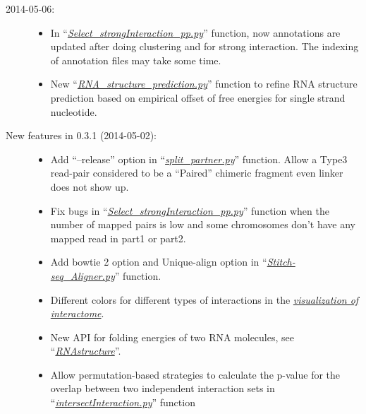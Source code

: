 \documentclass[letterpaper,10pt,english]{sphinxmanual}
\begin{document}
\begin{description}
\begin{itemize}
\end{itemize}

\item[{2014-05-06:}] \leavevmode\begin{itemize}
\item {} 
In ``{\hyperref[Analysis_pipeline:step6]{\emph{Select\_strongInteraction\_pp.py}}}'' function, now annotations are updated after doing clustering and for strong interaction. The indexing of annotation files may take some time.

\item {} 
New ``{\hyperref[Analysis_pipeline:structure]{\emph{RNA\_structure\_prediction.py}}}'' function to refine RNA structure prediction based on empirical offset of free energies for single strand nucleotide.

\end{itemize}

\item[{New features in 0.3.1 (2014-05-02):}] \leavevmode\begin{itemize}
\item {} 
Add ``--release'' option in ``{\hyperref[Analysis_pipeline:step4]{\emph{split\_partner.py}}}'' function. Allow a Type3 read-pair considered to be a ``Paired'' chimeric fragment even linker does not show up.

\item {} 
Fix bugs in ``{\hyperref[Analysis_pipeline:step6]{\emph{Select\_strongInteraction\_pp.py}}}'' function when the number of mapped pairs is low and some chromosomes don't have any mapped read in part1 or part2.

\item {} 
Add bowtie 2 option and Unique-align option in ``{\hyperref[Analysis_pipeline:step5]{\emph{Stitch-seq\_Aligner.py}}}'' function.

\item {} 
Different colors for different types of interactions in the {\hyperref[Visualization:visualizationglobal]{\emph{visualization of interactome}}}.

\item {} 
New API for folding energies of two RNA molecules, see ``{\hyperref[Other_api:rnafold]{\emph{RNAstructure}}}''.

\item {} 
Allow permutation-based strategies to calculate the p-value for the overlap between two independent interaction sets in ``{\hyperref[Analysis_pipeline:intersection]{\emph{intersectInteraction.py}}}'' function


\end{itemize}
\end{description}
\end{document}
